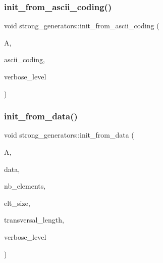 \mbox{\label{classstrong__generators_affe2c3088c70cdb7b5b67b5d9a6b5375}} 
\subsubsection{\texorpdfstring{init\+\_\+from\+\_\+ascii\+\_\+coding()}{init\_from\_ascii\_coding()}}
{\footnotesize\ttfamily void strong\+\_\+generators\+::init\+\_\+from\+\_\+ascii\+\_\+coding (\begin{DoxyParamCaption}\item[{\mbox{\hyperlink{classaction}{action}} $\ast$}]{A,  }\item[{\mbox{\hyperlink{galois_8h_ab6cc7b4aeb6ea31aba2b3fbfc83ff5e6}{B\+Y\+TE}} $\ast$}]{ascii\+\_\+coding,  }\item[{\mbox{\hyperlink{galois_8h_a09fddde158a3a20bd2dcadb609de11dc}{I\+NT}}}]{verbose\+\_\+level }\end{DoxyParamCaption})}

\mbox{\label{classstrong__generators_a9424d2f1794baf506746d25e9f9fefda}} 
\subsubsection{\texorpdfstring{init\+\_\+from\+\_\+data()}{init\_from\_data()}}
{\footnotesize\ttfamily void strong\+\_\+generators\+::init\+\_\+from\+\_\+data (\begin{DoxyParamCaption}\item[{\mbox{\hyperlink{classaction}{action}} $\ast$}]{A,  }\item[{\mbox{\hyperlink{galois_8h_a09fddde158a3a20bd2dcadb609de11dc}{I\+NT}} $\ast$}]{data,  }\item[{\mbox{\hyperlink{galois_8h_a09fddde158a3a20bd2dcadb609de11dc}{I\+NT}}}]{nb\+\_\+elements,  }\item[{\mbox{\hyperlink{galois_8h_a09fddde158a3a20bd2dcadb609de11dc}{I\+NT}}}]{elt\+\_\+size,  }\item[{\mbox{\hyperlink{galois_8h_a09fddde158a3a20bd2dcadb609de11dc}{I\+NT}} $\ast$}]{transversal\+\_\+length,  }\item[{\mbox{\hyperlink{galois_8h_a09fddde158a3a20bd2dcadb609de11dc}{I\+NT}}}]{verbose\+\_\+level }\end{DoxyParamCaption})}


